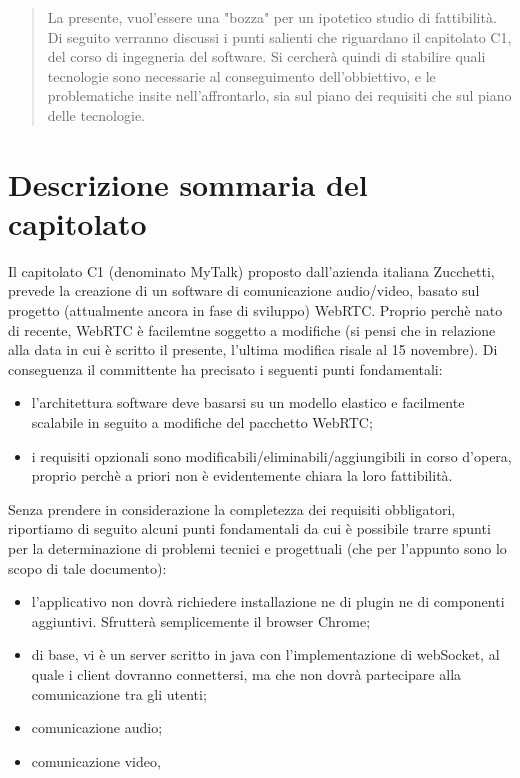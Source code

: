 \begin{abstract}
La presente, vuol'essere una "bozza" per un ipotetico studio di fattibilità. Di seguito verranno discussi i punti salienti che riguardano il capitolato C1, del corso di ingegneria del software. Si cercherà quindi di stabilire quali tecnologie sono necessarie al conseguimento dell'obbiettivo, e le problematiche insite nell'affrontarlo, sia sul piano dei requisiti che sul piano delle tecnologie.
\end{abstract}
\newpage

\section{Descrizione sommaria del capitolato}
Il capitolato C1 (denominato MyTalk) proposto dall'azienda italiana Zucchetti, prevede la creazione di un software di comunicazione audio/video, basato sul progetto (attualmente ancora in fase di sviluppo) WebRTC. Proprio perchè nato di recente, WebRTC è facilemtne soggetto a modifiche (si pensi che in relazione alla data in cui è scritto il presente, l'ultima modifica risale al 15 novembre). Di conseguenza il committente ha precisato i seguenti punti fondamentali:

\begin{itemize}
	\item l'architettura software deve basarsi su un modello elastico e facilmente scalabile in seguito a modifiche del pacchetto WebRTC;
	\item i requisiti opzionali sono modificabili/eliminabili/aggiungibili in corso d'opera, proprio perchè a priori non è evidentemente chiara la loro fattibilità.
\end{itemize}

Senza prendere in considerazione la completezza dei requisiti obbligatori, riportiamo di seguito alcuni punti fondamentali da cui è possibile trarre spunti per la determinazione di problemi tecnici e progettuali (che per l'appunto sono lo scopo di tale documento):

\begin{itemize}
	\item l'applicativo non dovrà richiedere installazione ne di plugin ne di componenti aggiuntivi. Sfrutterà semplicemente il browser Chrome;
	\item di base, vi è un server scritto in java con l'implementazione di webSocket, al quale i client dovranno connettersi, ma che non dovrà partecipare alla comunicazione tra gli utenti;
	\item comunicazione audio;
	\item comunicazione video,
\end{itemize}

